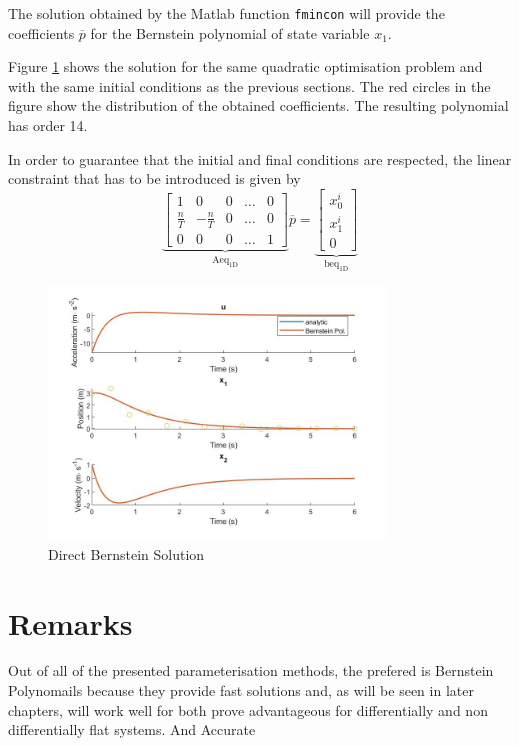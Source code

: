 \par The solution obtained by the Matlab function \texttt{fmincon} will provide the coefficients $\overline{p}$ for the Bernstein polynomial of state variable $x_1$. 

\par Figure \ref{fig:bernstein_1d} shows the solution for the same quadratic optimisation problem and with the same initial conditions as the previous sections. The red circles in the figure show the distribution of the obtained coefficients. The resulting polynomial has order 14.

\par In order to guarantee that the initial and final conditions are respected, the linear constraint that has to be introduced is given by
\begin{equation}
    \label{eq:bern_equality}
    \underbrace{\begin{bmatrix}
        1 & 0 & 0 & \dots & 0 \\
        \frac{n}{T} & -\frac{n}{T} & 0 & \dots & 0 \\
        0 & 0 & 0 & \dots & 1 \end{bmatrix}}_{\text{Aeq}_{\text{1D}}} \overline{p} =
    \underbrace{\begin{bmatrix}
        x_0^i \\ x_1^i \\ 0\end{bmatrix}}_{\text{beq}_{\text{1D}}}
\end{equation}


\begin{figure}[h!]
\centering
\includegraphics[width=0.8\textwidth]{Images/bernstein_1d.jpg}
\caption{Direct Bernstein Solution}
\label{fig:bernstein_1d}
\end{figure}


\section{Remarks}

\par Out of all of the presented parameterisation methods, the prefered is Bernstein Polynomails because they provide fast solutions and, as will be seen in later chapters, will work well for both prove advantageous for differentially and non differentially flat systems. And Accurate 
\par 

